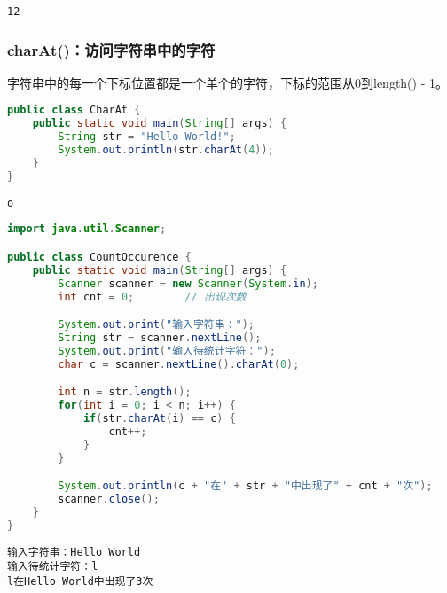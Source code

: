\begin{tcolorbox}
	\begin{verbatim}
12
	\end{verbatim}
\end{tcolorbox}

\subsubsection{charAt()：访问字符串中的字符}

字符串中的每一个下标位置都是一个单个的字符，下标的范围从0到length() - 1。

\vspace{0.5cm}


\begin{lstlisting}[language=Java]
public class CharAt {
	public static void main(String[] args) {
		String str = "Hello World!";
		System.out.println(str.charAt(4));
	}
}
\end{lstlisting}

\begin{tcolorbox}
	\begin{verbatim}
o
	\end{verbatim}
\end{tcolorbox}

\vspace{0.5cm}


\begin{lstlisting}[language=Java]
import java.util.Scanner;

public class CountOccurence {
	public static void main(String[] args) {
		Scanner scanner = new Scanner(System.in);
		int cnt = 0;		// 出现次数

		System.out.print("输入字符串：");
		String str = scanner.nextLine();
		System.out.print("输入待统计字符：");
		char c = scanner.nextLine().charAt(0);

		int n = str.length();
		for(int i = 0; i < n; i++) {
			if(str.charAt(i) == c) {
				cnt++;
			}
		}

		System.out.println(c + "在" + str + "中出现了" + cnt + "次");
		scanner.close();
	}
}
\end{lstlisting}

\begin{tcolorbox}
	\begin{verbatim}
输入字符串：Hello World
输入待统计字符：l
l在Hello World中出现了3次
	\end{verbatim}
\end{tcolorbox}

